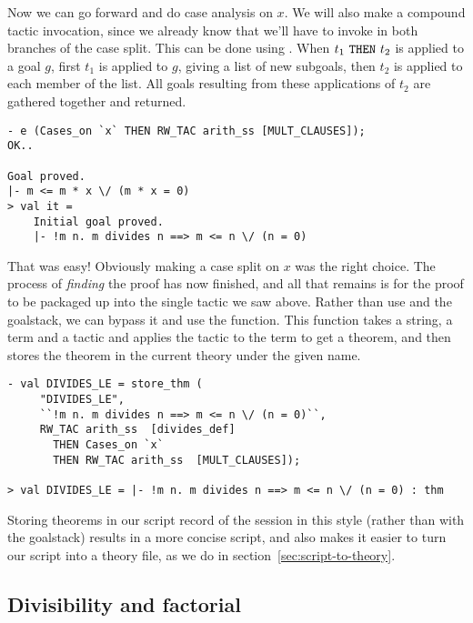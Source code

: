 Now we can go forward and do case analysis on $x$. We will also make a
compound tactic invocation, since we already know that we'll have to
invoke  in both branches of the case split. This can be
done using .  When $t_1 \ \mbox{\ml{THEN}}\ t_2$ is applied
to a goal $g$, first $t_1$ is applied to $g$, giving a list of new
subgoals, then $t_2$ is applied to each member of the list. All goals
resulting from these applications of $t_2$ are gathered together and
returned.
\begin{session}
\begin{verbatim}
- e (Cases_on `x` THEN RW_TAC arith_ss [MULT_CLAUSES]);
OK..

Goal proved.
|- m <= m * x \/ (m * x = 0)
> val it =
    Initial goal proved.
    |- !m n. m divides n ==> m <= n \/ (n = 0)
\end{verbatim}
\end{session}
That was easy! Obviously making a case split on $x$ was the right
choice. The process of {\it finding\/} the proof has now finished, and
all that remains is for the proof to be packaged up into the single
tactic we saw above.  Rather than use  and the goalstack,
we can bypass it and use the  function.  This function
takes a string, a term and a tactic and applies the tactic to the term
to get a theorem, and then stores the theorem in the current theory
under the given name.
\begin{session}
\begin{verbatim}
- val DIVIDES_LE = store_thm (
     "DIVIDES_LE",
     ``!m n. m divides n ==> m <= n \/ (n = 0)``,
     RW_TAC arith_ss  [divides_def]
       THEN Cases_on `x`
       THEN RW_TAC arith_ss  [MULT_CLAUSES]);

> val DIVIDES_LE = |- !m n. m divides n ==> m <= n \/ (n = 0) : thm
\end{verbatim}
\end{session}
Storing theorems in our script record of the session in this style
(rather than with the goalstack) results in a more concise script, and
also makes it easier to turn our script into a theory file, as we do
in section~\ref{sec:script-to-theory}.

\subsection{Divisibility and factorial}

